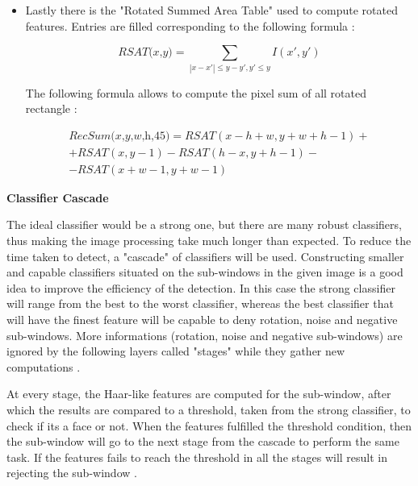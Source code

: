 \begin{itemize}
    \item Lastly there is the "Rotated Summed Area Table" \cite{Lienhart} used to compute rotated features. Entries are filled corresponding to the following formula \cite{Haar}: 
        \begin{center}
            \begin{equation}
                \textit{RSAT(x,y)} = \sum_{|x-x'| \leq y-y',y' \leq y} I(x',y')
            \end{equation}
        \end{center}
    The following formula allows to compute the pixel sum of all rotated rectangle \cite{Haar}:
        \begin{center}
            \begin{equation}
                \begin{multlined}
                    \textit{RecSum(x,y,w,h,45)} = RSAT(x-h+w,y+w+h-1)+\\+RSAT(x,y-1)-RSAT(h-x,y+h-1)-\\-RSAT(x+w-1,y+w-1)
                \end{multlined}
            \end{equation}
        \end{center}
\end{itemize}

\textbf{Classifier Cascade} \newline

The ideal classifier would be a strong one, but there are many robust classifiers, thus making the image processing take much longer than expected. To reduce the time taken to detect, a "cascade" of classifiers will be used. Constructing smaller and capable classifiers situated on the sub-windows in the given image is a good idea to improve the efficiency of the detection. In this case the strong classifier will range from the best to the worst classifier, whereas the best classifier that will have the finest feature will be capable to deny rotation, noise and negative sub-windows. More informations (rotation, noise and negative sub-windows) are ignored by the following layers called "stages" while they gather new computations \cite{OpenViola}. \par

At every stage, the Haar-like features are computed for the sub-window, after which the results are compared to a threshold, taken from the strong classifier, to check if its a face or not. When the features fulfilled the threshold condition, then the sub-window will go to the next stage from the cascade to perform the same task. If the features fails to reach the threshold in all the stages will result in rejecting the sub-window \cite{OpenViola}. \par

